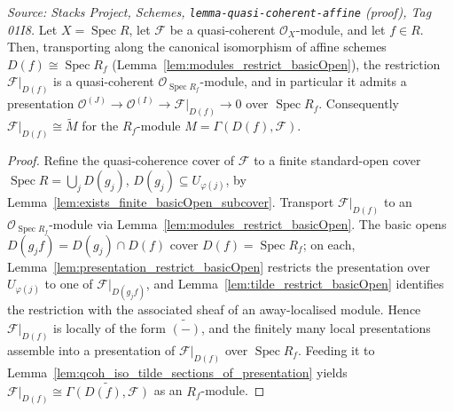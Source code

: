 \begin{lemma}
  \label{lem:isQuasicoherent_restrict_basicOpen}
  \textit{Source: Stacks Project, Schemes, \texttt{lemma-quasi-coherent-affine} (proof),
  Tag 01I8.}
  Let \(X = \operatorname{Spec} R\), let \(\mathcal{F}\) be a quasi-coherent
  \(\mathcal{O}_X\)-module, and let \(f \in R\). Then, transporting along the canonical
  isomorphism of affine schemes \(D(f) \cong \operatorname{Spec} R_f\)
  (Lemma~\ref{lem:modules_restrict_basicOpen}), the restriction \(\mathcal{F}|_{D(f)}\) is a
  quasi-coherent \(\mathcal{O}_{\operatorname{Spec} R_f}\)-module, and in particular it admits a
  presentation \(\mathcal{O}^{(J)} \to \mathcal{O}^{(I)} \to \mathcal{F}|_{D(f)} \to 0\) over
  \(\operatorname{Spec} R_f\). Consequently \(\mathcal{F}|_{D(f)} \cong \widetilde{M}\) for the
  \(R_f\)-module \(M = \Gamma(D(f), \mathcal{F})\).
\end{lemma}
\begin{proof}
  Refine the quasi-coherence cover of \(\mathcal{F}\) to a finite standard-open cover
  \(\operatorname{Spec} R = \bigcup_j D(g_j)\), \(D(g_j) \subseteq U_{\varphi(j)}\), by
  Lemma~\ref{lem:exists_finite_basicOpen_subcover}. Transport \(\mathcal{F}|_{D(f)}\) to an
  \(\mathcal{O}_{\operatorname{Spec} R_f}\)-module via
  Lemma~\ref{lem:modules_restrict_basicOpen}. The basic opens
  \(D(g_j f) = D(g_j) \cap D(f)\) cover \(D(f) = \operatorname{Spec} R_f\); on each,
  Lemma~\ref{lem:presentation_restrict_basicOpen} restricts the presentation over
  \(U_{\varphi(j)}\) to one of \(\mathcal{F}|_{D(g_j f)}\), and
  Lemma~\ref{lem:tilde_restrict_basicOpen} identifies the restriction with the associated sheaf
  of an away-localised module. Hence \(\mathcal{F}|_{D(f)}\) is locally of the form
  \(\widetilde{(-)}\), and the finitely many local presentations assemble into a presentation of
  \(\mathcal{F}|_{D(f)}\) over \(\operatorname{Spec} R_f\). Feeding it to
  Lemma~\ref{lem:qcoh_iso_tilde_sections_of_presentation} yields
  \(\mathcal{F}|_{D(f)} \cong \widetilde{\Gamma(D(f), \mathcal{F})}\) as an \(R_f\)-module.
\end{proof}

